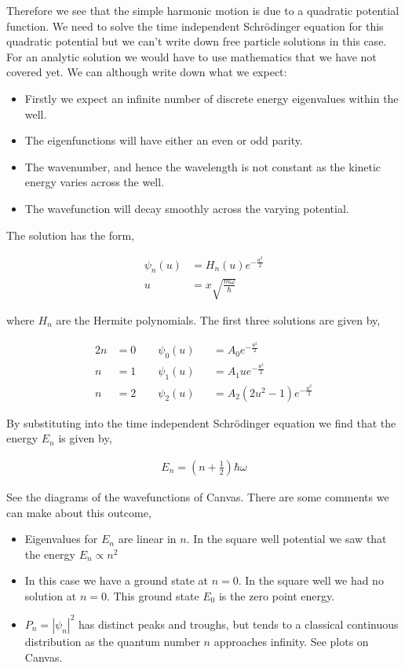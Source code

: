 \documentclass[11pt]{amsart}
\begin{document}
Therefore we see that the simple harmonic motion is due to a quadratic potential function. We need to solve the time independent Schr\"{o}dinger equation for this quadratic potential but we can't write down free particle solutions in this case. For an analytic solution we would have to use mathematics that we have not covered yet. We can although write down what we expect:

\begin{itemize}
\item Firstly we expect an infinite number of discrete energy eigenvalues within the well.
\item The eigenfunctions will have either an even or odd parity.
\item The wavenumber, and hence the wavelength is not constant as the kinetic energy varies across the well.
\item The wavefunction will decay smoothly across the varying potential.
\end{itemize}

The solution has the form,

\begin{align*}
  \psi_n(u) &= H_n(u) e^{-\frac{u^2}{2}} \\
  u &= x\sqrt{\frac{m\omega}{\hbar}}
\end{align*}

where $H_n$ are the Hermite polynomials. The first three solutions are given by,

\begin{alignat*}{2}
  n &= 0 \qquad \psi_0(u) &&= A_0 e^{-\frac{u^2}{2}} \\
  n &= 1 \qquad \psi_1(u) &&= A_1 u e^{-\frac{u^2}{2}} \\
  n &= 2 \qquad \psi_2(u) &&= A_2 (2u^2 - 1) e^{-\frac{u^2}{2}}
\end{alignat*}

By substituting into the time independent Schr\"{o}dinger equation we find that the energy $E_n$ is given by,

\begin{align*}
  E_n = \left(n + \frac{1}{2}\right)\hbar\omega
\end{align*}

See the diagrams of the wavefunctions of Canvas. There are some comments we can make about this outcome,

\begin{itemize}
  \item Eigenvalues for $E_n$ are linear in $n$. In the square well potential we saw that the energy $E_n \propto n^2$
  \item In this case we have a ground state at $n = 0$. In the square well we had no solution at $n = 0$. This ground state $E_0$ is the zero point energy.
  \item $P_n = {|\psi_n|}^2$ has distinct peaks and troughs, but tends to a classical continuous distribution as the quantum number $n$ approaches infinity. See plots on Canvas.
\end{itemize}
\end{document}
